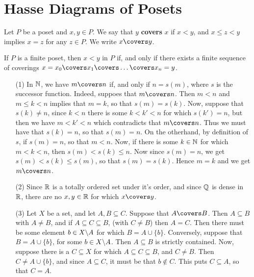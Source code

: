 \section{Hasse Diagrams of Posets}
\label{section_1.3}

\begin{definition}
  Let $P$ be a poset and  $x,y \in P$. We say that $y$
  \textbf{covers} $x$ if  $x < y$, and  $x \leq z < y$ implies $x=z$
  for any  $z \in P$. We write $x \covers y$.
\end{definition}

\begin{lemma}\label{lemma_1.3.1}
  If $P$ is a finite poset, then  $x < y$ in $P$ if, and only if there
  exists a finite sequence of coverings $x=x_0 \covers x_1 \covers
  \dots \covers x_n=y$.
\end{lemma}

\begin{example}\label{example_1.6}
  \begin{enumerate}
    \item[(1)] In $\mathbb{N}$, we have  $m \covers n$ if, and only if
      $n=s(m)$, where $s$ is the successor function. Indeed, suppoes
      that  $m \covers n$. Then $m < n$ and  $m \leq k<n$ implies that
      $m=k$, so that $s(m)=s(k)$. Now, suppose that $s(k) \neq n$,
      since $k < n$ there is some $k<k'<n$ for which $s(k')=n$, but
      then we have $m<k'<n$ which contradicts that $m \covers n$. Thus
      we must have that $s(k)=n$, so that $s(m)=n$. On the otherhand,
      by definition of $s$, if  $s(m)=n$, so that $m<n$. Now, if there
     is some $k \in \mathbb{N}$ for which $m<k<n$, then $s(m)<s(k) \leq n$. Now
     since $s(m)=n$, we get $s(m)<s(k) \leq s(m)$, so that
     $s(m)=s(k)$. Hence $m=k$ and we get  $m \covers n$.

   \item[(2)] Since $\mathbb{R}$ is a totally ordered set under it's order,
     and since  $\mathbb{Q}$ is dense in  $\mathbb{R}$, there are no  $x,y \in \mathbb{R}$ for
     which $x \covers y$.

   \item[(3)] Let $X$ be a set, and let  $A,B \subseteq C$. Suppose
     that $A \covers B$. Then $A \subseteq B$ with $A \neq B$, and if
     $A \subseteq C \subseteq B$, (with $C \neq B$) then $A=C$. Then
     there must be some element  $b \in X \backslash A$ for which $B=A
     \cup \{b\}$. Conversely, suppose that $B=A \cup \{b\}$, for some
     $b \in X \backslash A$. Then $A \subseteq B$ is strictly contained.
     Now, suppose there is a $C \subseteq X$ for which $A \subseteq C
     \subseteq B$, and $C \neq B$. Then $C \neq A \cup \{b\}$, and
     since $A \subseteq C$, it must be that $b \notin C$. This puts
     $C \subseteq A$, so that $C=A$.
  \end{enumerate}
\end{example}

